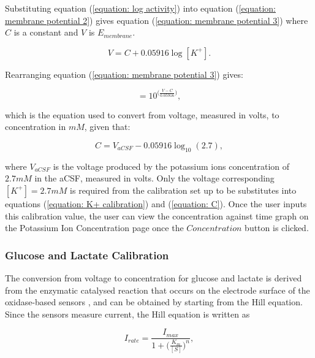 Substituting equation (\ref{equation: log activity}) into equation (\ref{equation: membrane potential 2}) gives equation (\ref{equation: membrane potential 3}) where $C$ is a constant and $V$ is $E_{membrane}$.

\begin{equation}
    V = C + 0.05916 \log [K^{+}].
    \label{equation: membrane potential 3}
\end{equation}

Rearranging equation (\ref{equation: membrane potential 3}) gives:

\begin{equation}
    [K^{+}] = 10^{\big(\frac{V-C}{0.05916}\big)},
    \label{equation: K+ calibration}
\end{equation}

\noindent which is the equation used to convert from voltage, measured in volts, to concentration in $mM$, given that:

\begin{equation}
    C = V_{aCSF} - 0.05916\log_{10} (2.7),
    \label{equation: C}
\end{equation}

\noindent where $V_{aCSF}$ is the voltage produced by the potassium ions concentration of $2.7mM$ in the aCSF, measured in volts. Only the voltage corresponding $[K^{+}] = 2.7mM$ is required from the calibration set up to be substitutes into equations (\ref{equation: K+ calibration}) and (\ref{equation: C}). Once the user inputs this calibration value, the user can view the concentration against time graph on the Potassium Ion Concentration page once the $Concentration$ button is clicked. \newline


\subsubsection{Glucose and Lactate Calibration}

The conversion from voltage to concentration for glucose and lactate is derived from the enzymatic catalysed reaction that occurs on the electrode surface of the oxidase-based sensors \cite{Patel:2011:10.1016/j.bios.2010.11.033, Rogers2017}, and can be obtained by starting from the Hill equation. Since the sensors measure current, the Hill equation is written as

\begin{equation}
    I_{rate} = \frac{I_{max}}{1 + \big( \frac{K_{m}}{[S]} \big)^{n}},
    \label{equation: Hill equation}
\end{equation}

